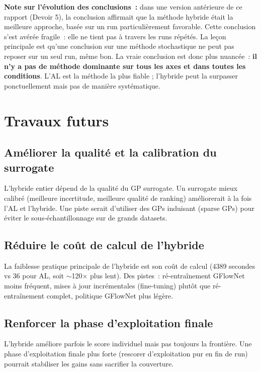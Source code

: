 \documentclass[10pt]{article}
\begin{document}
\textbf{Note sur l'évolution des conclusions~:} dans une version antérieure de ce rapport (Devoir 5), la conclusion affirmait que la méthode hybride était la meilleure approche, basée sur un run particulièrement favorable. Cette conclusion s'est avérée fragile~: elle ne tient pas à travers les runs répétés. La leçon principale est qu'une conclusion sur une méthode stochastique ne peut pas reposer sur un seul run, même bon. La vraie conclusion est donc plus nuancée~: \textbf{il n'y a pas de méthode dominante sur tous les axes et dans toutes les conditions}. L'AL est la méthode la plus fiable ; l'hybride peut la surpasser ponctuellement mais pas de manière systématique.

\section{Travaux futurs}

\subsection{Améliorer la qualité et la calibration du surrogate}
L'hybride entier dépend de la qualité du GP surrogate. Un surrogate mieux calibré (meilleure incertitude, meilleure qualité de ranking) améliorerait à la fois l'AL et l'hybride. Une piste serait d'utiliser des GPs induisant (sparse GPs) pour éviter le sous-échantillonnage sur de grands datasets.

\subsection{Réduire le coût de calcul de l'hybride}
La faiblesse pratique principale de l'hybride est son coût de calcul (4389 secondes vs 36 pour AL, soit $\sim$120$\times$ plus lent). Des pistes~: ré-entraînement GFlowNet moins fréquent, mises à jour incrémentales (fine-tuning) plutôt que ré-entraînement complet, politique GFlowNet plus légère.

\subsection{Renforcer la phase d'exploitation finale}
L'hybride améliore parfois le score individuel mais pas toujours la frontière. Une phase d'exploitation finale plus forte (rescorer d'exploitation pur en fin de run) pourrait stabiliser les gains sans sacrifier la couverture.
\end{document}
